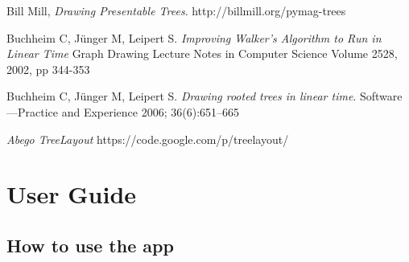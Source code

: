 \documentclass{report}
\begin{document}
\begin{thebibliography}{9}
  Bill Mill,
  \emph{Drawing Presentable Trees}.
  http://billmill.org/pymag-trees

  Buchheim C, J\"unger M, Leipert S. 
  \emph{Improving Walker's Algorithm to Run in Linear Time}
  Graph Drawing Lecture Notes in Computer Science Volume 2528, 
  2002, pp 344-353

  Buchheim C, J\"unger M, Leipert S. 
  \emph{Drawing rooted trees in linear time}. 
  Software—Practice and Experience 2006; 36(6):651–665

  \emph{Abego TreeLayout}
  https://code.google.com/p/treelayout/

\end{thebibliography}

\chapter{User Guide}
\section{How to use the app}
\end{document}
